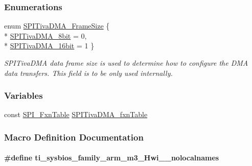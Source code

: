 \subsubsection*{Enumerations}
\begin{DoxyCompactItemize}
\item 
enum \hyperlink{_s_p_i_tiva_d_m_a_8h_a65cb55b42cf383ece69876f50ba2d0a4}{S\-P\-I\-Tiva\-D\-M\-A\-\_\-\-Frame\-Size} \{ \\*
\hyperlink{_s_p_i_tiva_d_m_a_8h_a65cb55b42cf383ece69876f50ba2d0a4aa58606ada645870d2aaef1405aa44544}{S\-P\-I\-Tiva\-D\-M\-A\-\_\-8bit} = 0, 
\\*
\hyperlink{_s_p_i_tiva_d_m_a_8h_a65cb55b42cf383ece69876f50ba2d0a4a4db41d561526d534aa9a0d806a49d42a}{S\-P\-I\-Tiva\-D\-M\-A\-\_\-16bit} = 1
 \}
\begin{DoxyCompactList}\small\item\em S\-P\-I\-Tiva\-D\-M\-A data frame size is used to determine how to configure the D\-M\-A data transfers. This field is to be only used internally. \end{DoxyCompactList}\end{DoxyCompactItemize}
\subsubsection*{Variables}
\begin{DoxyCompactItemize}
\item 
const \hyperlink{struct_s_p_i___fxn_table}{S\-P\-I\-\_\-\-Fxn\-Table} \hyperlink{_s_p_i_tiva_d_m_a_8h_a9802f6bf37a0ffb9e685352a7334aa91}{S\-P\-I\-Tiva\-D\-M\-A\-\_\-fxn\-Table}
\end{DoxyCompactItemize}


\subsubsection{Macro Definition Documentation}
\paragraph[{ti\-\_\-sysbios\-\_\-family\-\_\-arm\-\_\-m3\-\_\-\-Hwi\-\_\-\-\_\-nolocalnames}]{\setlength{\rightskip}{0pt plus 5cm}\#define ti\-\_\-sysbios\-\_\-family\-\_\-arm\-\_\-m3\-\_\-\-Hwi\-\_\-\-\_\-nolocalnames}\label{_s_p_i_tiva_d_m_a_8h_aaa17ecf48f5762e2e1bdb0bab8aacf0c}
